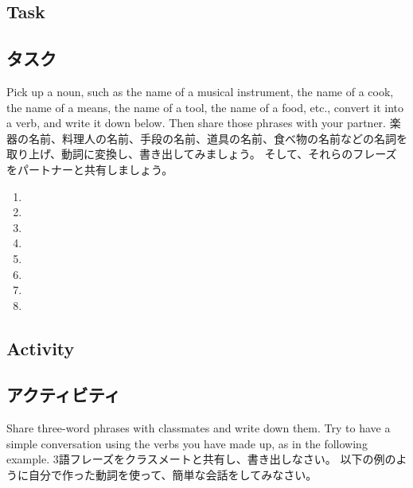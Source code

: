 \documentclass[uplatex,dvipdfmx,b5paper,english,10pt]{jsbook}
\begin{document}
\ifEnglish
\subsection{Task}
\else
\subsection{タスク}
\fi

\begin{toiquestion}
\ifEnglish
Pick up a noun, such as the name of a musical instrument, the name of a cook, the name of a means, the name of a tool, the name of a food, etc.,
convert it into a verb, and write it down below.
Then share those phrases with your partner.
\else
楽器の名前、料理人の名前、手段の名前、道具の名前、食べ物の名前などの名詞を取り上げ、動詞に変換し、書き出してみましょう。
そして、それらのフレーズをパートナーと共有しましょう。
\fi
\end{toiquestion}

\begin{multicols}{2}
 \begin{enumerate}
   \item \hrulefill
   \item \hrulefill
   \item \hrulefill
   \item \hrulefill
   \item \hrulefill
   \item \hrulefill
   \item \hrulefill
   \item \hrulefill
 \end{enumerate}
\end{multicols}

\ifEnglish
\subsection{Activity}
\else
\subsection{アクティビティ}
\fi

\begin{toiquestion}
\ifEnglish
Share three-word phrases with classmates and write down them.
Try to have a simple conversation using the verbs you have made up, as in the following example.
\else
3語フレーズをクラスメートと共有し、書き出しなさい。
以下の例のように自分で作った動詞を使って、簡単な会話をしてみなさい。
\fi
\end{toiquestion}
\end{document}
